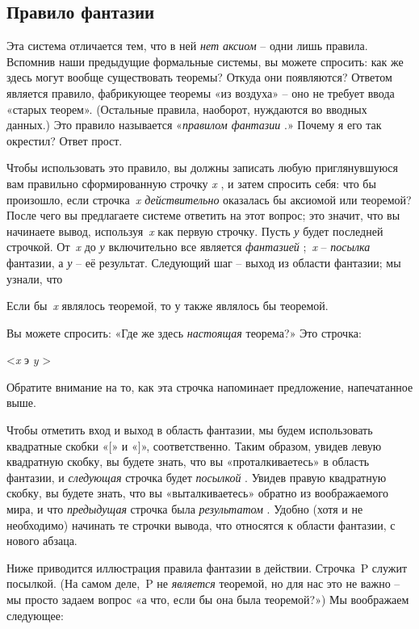 \documentclass[../main.tex]{subfiles}
\begin{document}
\subsection{Правило фантазии}

Эта система отличается тем, что в ней \emph{нет аксиом} \--- одни лишь правила. Вспомнив наши предыдущие формальные системы, вы можете спросить: как же здесь могут вообще существовать теоремы? Откуда они появляются? Ответом является правило, фабрикующее теоремы «из воздуха» \--- оно не требует ввода «старых теорем». (Остальные правила, наоборот, нуждаются во вводных данных.) Это правило называется «\emph{правилом фантазии} .» Почему я его так окрестил? Ответ прост.

Чтобы использовать это правило, вы должны записать любую приглянувшуюся вам правильно сформированную строчку \emph{x} , и затем спросить себя: что бы произошло, если строчка~\emph{x действительно} оказалась бы аксиомой или теоремой? После чего вы предлагаете системе ответить на этот вопрос; это значит, что вы начинаете вывод, используя~\emph{x} как первую строчку. Пусть \emph{у} будет последней строчкой. От~\emph{x} до \emph{у} включительно все является \emph{фантазией} ;~\emph{x} \--- \emph{посылка} фантазии, а \emph{у} \--- её результат. Следующий шаг \--- выход из области фантазии; мы узнали, что

Если бы~\emph{x} являлось теоремой, то у также являлось бы теоремой.

Вы можете спросить: «Где же здесь \emph{настоящая} теорема?» Это строчка:

\textless{}\emph{x} э \emph{y} \textgreater{}

Обратите внимание на то, как эта строчка напоминает предложение, напечатанное выше.

Чтобы отметить вход и выход в область фантазии, мы будем использовать квадратные скобки «{[}» и «{]}», соответственно. Таким образом, увидев левую квадратную скобку, вы будете знать, что вы «проталкиваетесь» в область фантазии, и \emph{следующая} строчка будет \emph{посылкой} . Увидев правую квадратную скобку, вы будете знать, что вы «выталкиваетесь» обратно из воображаемого мира, и что \emph{предыдущая} строчка была \emph{результатом} . Удобно (хотя и не необходимо) начинать те строчки вывода, что относятся к области фантазии, с нового абзаца.

Ниже приводится иллюстрация правила фантазии в действии. Строчка~P служит посылкой. (На самом деле,~P не \emph{является} теоремой, но для нас это не важно \--- мы просто задаем вопрос «а что, если бы она была теоремой?») Мы воображаем следующее:
\end{document}
